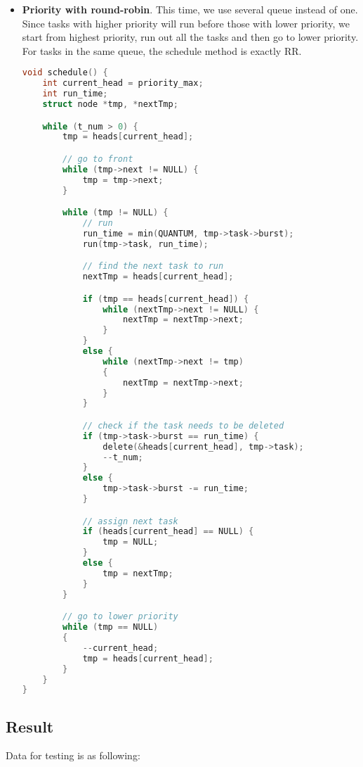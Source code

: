 \documentclass{article}
\begin{document}
\begin{itemize}
    \item \textbf{Priority with round-robin}. This time, we use several queue instead of one. Since tasks with higher priority will run before those with lower priority, we start from highest priority, run out all the tasks and then go to lower priority. For tasks in the same queue, the schedule method is exactly RR.
    
    \begin{lstlisting}[language=c, caption={schedule() for Priority with round-robin}]
void schedule() {
    int current_head = priority_max;
    int run_time;
    struct node *tmp, *nextTmp;

    while (t_num > 0) {
        tmp = heads[current_head];

        // go to front
        while (tmp->next != NULL) {
            tmp = tmp->next;
        }

        while (tmp != NULL) {
            // run
            run_time = min(QUANTUM, tmp->task->burst);
            run(tmp->task, run_time);

            // find the next task to run
            nextTmp = heads[current_head];

            if (tmp == heads[current_head]) {
                while (nextTmp->next != NULL) {
                    nextTmp = nextTmp->next;
                }
            }
            else {
                while (nextTmp->next != tmp)
                {
                    nextTmp = nextTmp->next;
                }            
            }

            // check if the task needs to be deleted
            if (tmp->task->burst == run_time) {           
                delete(&heads[current_head], tmp->task);
                --t_num;
            }
            else {
                tmp->task->burst -= run_time;
            }

            // assign next task
            if (heads[current_head] == NULL) {
                tmp = NULL;
            }
            else {
                tmp = nextTmp;
            }
        }

        // go to lower priority
        while (tmp == NULL)
        {
            --current_head;
            tmp = heads[current_head];
        }
    }
}
    \end{lstlisting}
\end{itemize}

\subsection*{Result}
Data for testing is as following:
\end{document}
